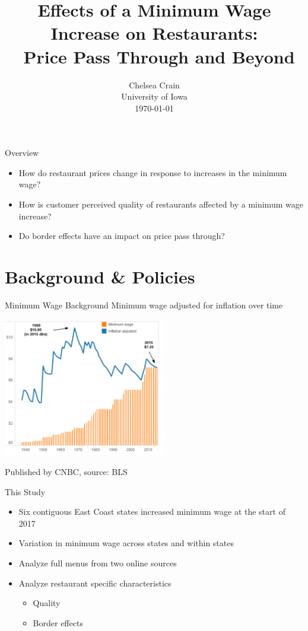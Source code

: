 \documentclass[xcolor=table]{beamer}
\title[Effects of a Minimum Wage Increase on Restaurants] %
{\large Effects of a Minimum Wage Increase on Restaurants: \\\
 Price Pass Through and Beyond}
\author[Chelsea Crain] %
{}
\institute[] %
\date %
{Chelsea Crain\\
University of Iowa\\
\today \\

}
\begin{document}
\begin{spacing}{1.2}
\begin{frame}
  \titlepage
\end{frame}



\begin{frame}{Overview}
\begin{itemize}
\item How do restaurant prices change in response to increases in the minimum wage?
\bigskip
\item How is customer perceived quality of restaurants affected by a minimum wage increase?
\bigskip
 \item Do border effects have an impact on price pass through?
\end{itemize}

\end{frame}

\section{Background \& Policies}

\begin{frame}{Minimum Wage Background}
Minimum wage adjusted for inflation over time

\bigskip 

\centering
\includegraphics[width=2.8in]{cnbc_graph.png}

\raggedleft
\tiny{Published by CNBC, source: BLS}
\end{frame}


\begin{frame}{This Study}
\begin{itemize}
\item Six contiguous East Coast states increased minimum wage at the start of 2017
\item Variation in minimum wage across states and within states
\item Analyze full menus from two online sources
\item Analyze restaurant specific characteristics 
\begin{itemize}
\item Quality
\item Border effects
\end{itemize}


\end{itemize}
\end{frame}
\end{spacing}
\end{document}
